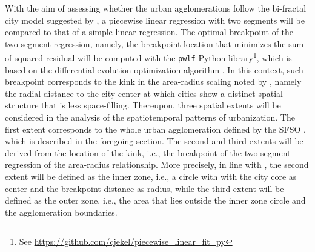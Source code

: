 With the aim of assessing whether the urban agglomerations follow the bi-fractal city model suggested by \cite{white1993cellular}, a piecewise linear regression with two segments will be compared to that of a simple linear regression. The optimal breakpoint of the two-segment regression, namely, the breakpoint location that minimizes the sum of squared residual will be computed with the \texttt{pwlf} Python library\footnote{See \url{https://github.com/cjekel/piecewise_linear_fit_py}}, which is based on the differential evolution optimization algorithm \citep{storn1997differential}.
In this context, such breakpoint corresponds to the kink in the area-radius scaling noted by \cite{frankhauser1994fractalite}, namely the radial distance to the city center at which cities show a distinct spatial structure that is less space-filling.
Thereupon, three spatial extents will be considered in the analysis of the spatiotemporal patterns of urbanization. The first extent corresponds to the whole urban agglomeration defined by the SFSO , which is described in the foregoing section. The second and third extents will be derived from the location of the kink, i.e., the breakpoint of the two-segment regression of the area-radius relationship. More precisely, in line with \cite{white1993cellular}, the second extent will be defined as the inner zone, i.e., a circle with with the city core as center and the breakpoint distance as radius, while the third extent will be defined as the outer zone, i.e., the area that lies outside the inner zone circle and the agglomeration boundaries.


